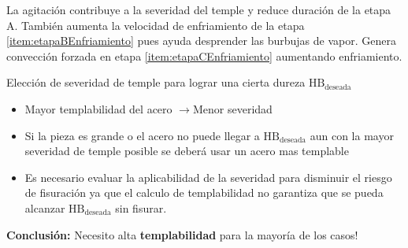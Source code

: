 \documentclass{article}
\newcommand{\HB}{\ensuremath{\mathrm{HB}}}
\newcommand{\goright}{\ensuremath{\rightarrow}}
\begin{document}
La agitación contribuye a la severidad del temple y reduce  duración de la etapa A. También aumenta la velocidad de enfriamiento de la etapa \ref{item:etapaBEnfriamiento} pues ayuda desprender las burbujas de vapor. Genera convección forzada en etapa \ref{item:etapaCEnfriamiento}  aumentando enfriamiento.

Elección de severidad de temple para lograr una cierta dureza $\HB_{\mathrm{deseada}}$
\begin{itemize}
    \item Mayor templabilidad del acero \goright Menor severidad
    \item Si la pieza es grande o el acero no puede llegar a $\HB_{\mathrm{deseada}}$ aun con la mayor severidad de temple posible se deberá usar un acero mas templable
    \item Es necesario evaluar la aplicabilidad de la severidad para disminuir el riesgo de fisuración ya que el calculo de templabilidad no garantiza que se pueda alcanzar $\HB_{\mathrm{deseada}}$ sin fisurar.
\end{itemize}
\textbf{Conclusión:} Necesito alta \textbf{templabilidad} para la mayoría de los casos!
\end{document}
